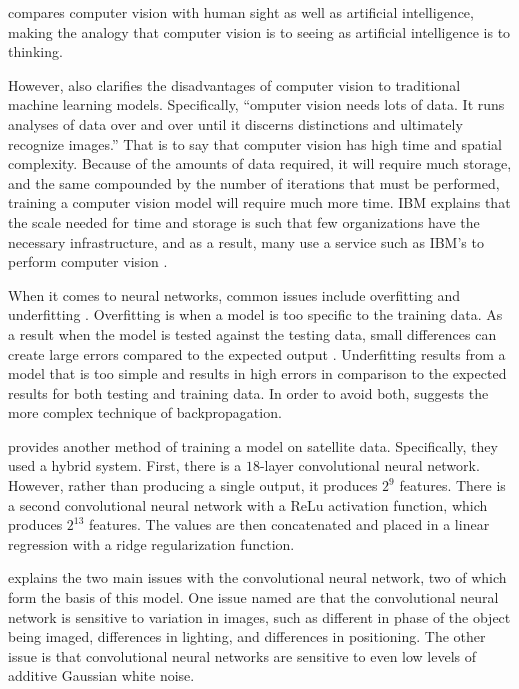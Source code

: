 \documentclass[11pt]{report}
\begin{document}
\textcite{IBM2020a} compares computer vision with human sight as well as artificial intelligence,
making the analogy that computer vision is to seeing as artificial intelligence is to thinking.

However, \textcite{IBM2020a} also clarifies the disadvantages of computer vision to traditional machine learning models.
Specifically, ``omputer vision needs lots of data. It runs analyses of data over and over until it discerns distinctions and ultimately recognize images.''
That is to say that computer vision has high time and spatial complexity.
Because of the amounts of data required,
it will require much storage,
and the same compounded by the number of iterations that must be performed,
training a computer vision model will require much more time.
IBM explains that the scale needed for time and storage is such that few organizations have the necessary infrastructure,
and as a result, many use a service such as IBM's to perform computer vision \cite{IBM2020a}.

When it comes to neural networks,
common issues include overfitting and underfitting%
\cite{Vignesh2020a}\cite{Lawrence2005a}.
Overfitting is when a model is too specific to the training data.
As a result when the model is tested against the testing data,
small differences can create large errors compared to the expected output%
\cite{Gao2022a}.
Underfitting results from a model that is too simple
and results in high errors in comparison to the expected results
for both testing and training data\cite{Vignesh2020a}.
In order to avoid both, \textcite{Lawrence2005a} suggests the more complex technique of backpropagation.

\textcite{Rolf2021a} provides another method of training a model on satellite data.
Specifically, they used a hybrid system.
First, there is a \(18\)-layer convolutional neural network\cite{MATLAB2018resnet_a}.
However, rather than producing a single output,
it produces \(2^{9}\) features.
There is a second convolutional neural network with a ReLu activation function, which produces \(2^{13}\) features\cite{Rolf2021a}.
The values are then concatenated and placed in a linear regression with a ridge regularization function\cite{Rolf2021a}.

\textcite{Sharma2020a} explains the two main issues with the convolutional neural network, two of which form the basis of this model.
One issue named are that the convolutional neural network is sensitive to variation in images,
such as different in phase of the object being imaged,
differences in lighting,
and differences in positioning.
The other issue is that convolutional neural networks are sensitive to even low levels of additive Gaussian white noise.
\end{document}
